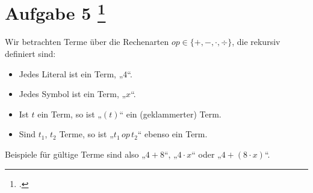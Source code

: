 \documentclass{lehramt-informatik-aufgabe}
\begin{document}
\section{Aufgabe 5
\footcite{examen:66116:2020:09}}


Wir betrachten Terme über die Rechenarten $op \in \{ +, -, \cdot, \div \}$, die
rekursiv definiert sind:

\begin{itemize}
\item Jedes Literal ist ein Term, \zB „$4$“.

\item Jedes Symbol ist ein Term, \zB „$x$“.

\item Ist $t$ ein Term, so ist „$(t)$“ ein (geklammerter) Term.

\item Sind $t_1$, $t_2$ Terme, so ist „$t_1 \, op \, t_2$“ ebenso ein
Term.

\end{itemize}
Beispiele für gültige Terme sind also „$4 + 8$“, „$4 \cdot x$“ oder „$4
+ (8 \cdot x)$“.
\end{document}
